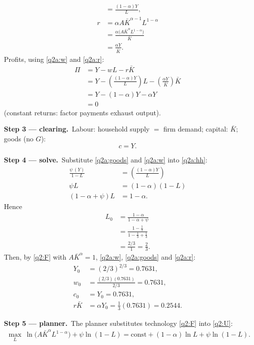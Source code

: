 \documentclass[11pt,a4paper]{article}
\newcommand{\passo}[2]{\par\smallskip\noindent\textbf{Step #1.}~#2}
\begin{document}
\begin{sol}
{\begin{align}
&= \frac{(1-\alpha)Y}{L}, \label{q2a:w}\\
r &= \alpha A\bar K^{\alpha-1}L^{1-\alpha}\nonumber\\
&= \frac{\alpha\big(A\bar K^{\alpha}L^{1-\alpha}\big)}{\bar K}\nonumber\\
&= \frac{\alpha Y}{\bar K}. \label{q2a:r}
\end{align}
Profits, using \eqref{q2a:w} and \eqref{q2a:r}:
\begin{align}
\Pi &= Y-wL-r\bar K\nonumber\\
&= Y-\left(\frac{(1-\alpha)Y}{L}\right)L-\left(\frac{\alpha Y}{\bar K}\right)\bar K\nonumber\\
&= Y-(1-\alpha)Y-\alpha Y\nonumber\\
&= \boxed{0} \label{q2a:pi}
\end{align}
(constant returns: factor payments exhaust output).}
\passo{3 --- clearing}{Labour: household supply $=$ firm demand; capital: $\bar K$; goods (no $G$):
\begin{equation}
c=Y. \label{q2a:goods}
\end{equation}}
\passo{4 --- solve}{Substitute \eqref{q2a:goods} and \eqref{q2a:w} into \eqref{q2a:hh}:
\begin{align*}
\frac{\psi\,(Y)}{1-L} &= \left(\frac{(1-\alpha)Y}{L}\right)\\
\psi L &= (1-\alpha)(1-L)\\
(1-\alpha+\psi)L &= 1-\alpha.
\end{align*}
Hence
\begin{align}
L_0 &= \boxed{\frac{1-\alpha}{1-\alpha+\psi}}\nonumber\\
&= \frac{1-\frac13}{1-\frac13+\frac13}\nonumber\\
&= \frac{2/3}{1}=\boxed{\tfrac23}. \label{q2a:L0}
\end{align}
Then, by \eqref{q2:F} with $A\bar K^{\alpha}=1$, \eqref{q2a:w}, \eqref{q2a:goods} and \eqref{q2a:r}:
\begin{align*}
Y_0 &= (2/3)^{2/3}=0.7631,\\
w_0 &= \frac{(2/3)(0.7631)}{2/3}=0.7631,\\
c_0 &= Y_0=0.7631,\\
r\bar K &= \alpha Y_0=\tfrac13(0.7631)=0.2544.
\end{align*}}
\passo{5 --- planner}{The planner substitutes technology \eqref{q2:F} into \eqref{q2:U}:
\begin{align}
\max_L\ \ln\!\big(A\bar K^{\alpha}L^{1-\alpha}\big)+\psi\ln(1-L)
=\text{const}+(1-\alpha)\ln L+\psi\ln(1-L). \label{q2a:plan}

\end{align}}
\end{sol}
\end{document}
